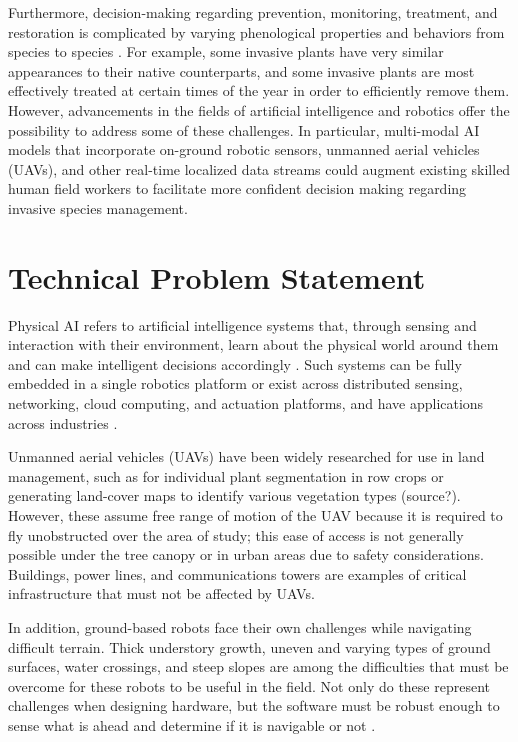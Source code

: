 \documentclass{article}
\begin{document}
Furthermore, decision-making regarding prevention, monitoring, treatment, and restoration is complicated by varying phenological properties and behaviors from species to species \cite{review-operations-research-models}. For example, some invasive plants have very similar appearances to their native counterparts, and some invasive plants are most effectively treated at certain times of the year in order to efficiently remove them. However, advancements in the fields of artificial intelligence and robotics offer the possibility to address some of these challenges. In particular, multi-modal AI models that incorporate on-ground robotic sensors, unmanned aerial vehicles (UAVs), and other real-time localized data streams could augment existing skilled human field workers to facilitate more confident decision making regarding invasive species management.


\section{Technical Problem Statement}
Physical AI refers to artificial intelligence systems that, through sensing and interaction with their environment, learn about the physical world around them and can make intelligent decisions accordingly \cite{10.1115/1.4070122}. Such systems can be fully embedded in a single robotics platform or exist across distributed sensing, networking, cloud computing, and actuation platforms, and have applications across industries \cite{10.1115/1.4070122}. 

Unmanned aerial vehicles (UAVs) have been widely researched for use in land management, such as for individual plant segmentation in row crops \cite{10161078} or generating land-cover maps to identify various vegetation types (source?). However, these assume free range of motion of the UAV because it is required to fly unobstructed over the area of study; this ease of access is not generally possible under the tree canopy or in urban areas due to safety considerations. Buildings, power lines, and communications towers are examples of critical infrastructure that must not be affected by UAVs. 

In addition, ground-based robots face their own challenges while navigating difficult terrain. Thick understory growth, uneven and varying types of ground surfaces, water crossings, and steep slopes are among the difficulties that must be overcome for these robots to be useful in the field. Not only do these represent challenges when designing hardware, but the software must be robust enough to sense what is ahead and determine if it is navigable or not \cite{10876033}.
\end{document}
